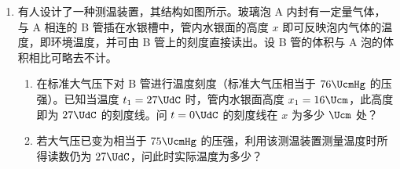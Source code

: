 \documentclass[\gkver]{gaokaozhenti}
\begin{document}
\begin{enumerate}
{$S_{1}$、$S_{2}$ 均闭合时：从 $a \to b$ ②

（2）$S_{1}$、$S_{2}$ 均开启时流过灯泡电流

$I_{1} = \frac{E}{R_{1} + R_{2} + R}$ ③

$S_{1}$、$S_{2}$ 均闭合时流过灯泡的电流

$I_{2} = \frac{E}{\frac{R R_{1}}{R + R_{1}} + R_{3}} \cdot \frac{R_{1}}{R + R_{1}}$ ④

同样正常发光，应有

$I_{1} = I_{2}$ ⑤

即

$\frac{E}{R_{1} + R_{2} + R} = \frac{E}{\frac{R R_{1}}{R + R_{1}} + R_{3}} \cdot \frac{R_{1}}{R + R_{1}}$ ⑥

解之，得

$R = \frac{R_{1}(R_{1} + R_{2} - R_{3})}{R_{3}} = \frac{3(3 + 9 - 6)}{6}\UO = 3\UO$

$U = \frac{E}{R_{1} + R_{2} + R}\cdot R = \frac{24}{3 + 9 + 3}\times 3\UV = 4.8\UV$

\textbf{评分标准}：（1）3 分：其中① 1 分② 2 分

（2）9 分：列出③式 1 分，列出④式 2 分。列出⑤式 2 分（直接列出⑥式得 5 分），得出 $R$、$U$ 结果各 2 分。
}

\item
有人设计了一种测温装置，其结构如图所示。玻璃泡 A 内封有一定量气体，与 A 相连的 B 管插在水银槽中，管内水银面的高度 $x$ 即可反映泡内气体的温度，即环境温度，并可由 B 管上的刻度直接读出。设 B 管的体积与 A 泡的体积相比可略去不计。
\begin{enumerate}
	\item
	在标准大气压下对 B 管进行温度刻度（标准大气压相当于 $76\UcmHg$ 的压强）。已知当温度 $t_{1} = 27\UdC$ 时，管内水银面高度 $x_{1} = 16\Ucm$，此高度即为 $27\UdC$ 的刻度线。问 $t = 0\UdC$ 的刻度线在 $x$ 为多少 $\Ucm$ 处？
	\item
	若大气压已变为相当于 $75\UcmHg$ 的压强，利用该测温装置测量温度时所得读数仍为 $27\UdC$，问此时实际温度为多少？
\end{enumerate}
\onepicture[align=right, h=4.41cm]{}

\end{enumerate}
\end{document}
